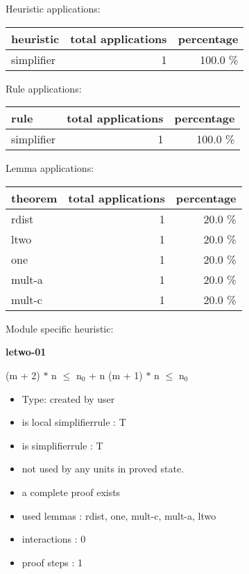 \documentclass[a4paper]{article}
\begin{document}
\medskip


Heuristic applications:

\begin{supertabular}{l|r|r}
heuristic	& total applications & percentage \\ \hline
simplifier & 1 & 100.0 \% \\

\end{supertabular}

Rule applications:

\begin{supertabular}{l|r|r}
rule	        & total applications & percentage \\ \hline
simplifier & 1 & 100.0 \% \\

\end{supertabular}

Lemma applications:

\begin{supertabular}{l|r|r}
theorem	        & total applications & percentage \\ \hline
rdist & 1 & 20.0 \% \\
ltwo & 1 & 20.0 \% \\
one & 1 & 20.0 \% \\
mult-a & 1 & 20.0 \% \\
mult-c & 1 & 20.0 \% \\

\end{supertabular}

Module specific heuristic:

\pagebreak

{\LARGE\bf letwo-01}\label{lemma-letwo-01}

\medskip

 \Fol (m + 2) $*$ n $\le$ $\mbox{n}_{0}$ + n \Equiv (m + 1) $*$ n $\le$ $\mbox{n}_{0}$

\begin{itemize}

\item Type: created by user

\item is local simplifierrule : T
\item is simplifierrule : T
\item not used by any units in proved state.
\item       a complete proof exists
\item       used lemmas  : rdist, one, mult-c, mult-a, ltwo
\item       interactions : 0
\item       proof steps  : 1
\end{itemize}
\end{document}
